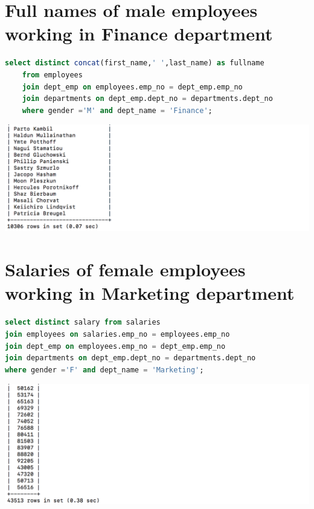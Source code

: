 \documentclass{article}
\begin{document}
\section{Full names of male employees working in Finance department}
\begin{lstlisting}[language=sql]
select distinct concat(first_name,' ',last_name) as fullname 
	from employees 
	join dept_emp on employees.emp_no = dept_emp.emp_no 
	join departments on dept_emp.dept_no = departments.dept_no
	where gender ='M' and dept_name = 'Finance';
\end{lstlisting}
\includegraphics[width=\linewidth]{out6.png}

\section{Salaries of female employees working in Marketing department}
\begin{lstlisting}[language=sql]
select distinct salary from salaries 
join employees on salaries.emp_no = employees.emp_no 
join dept_emp on employees.emp_no = dept_emp.emp_no 
join departments on dept_emp.dept_no = departments.dept_no
where gender ='F' and dept_name = 'Marketing';
\end{lstlisting}
\includegraphics[width=\linewidth]{out7.png}
\end{document}
